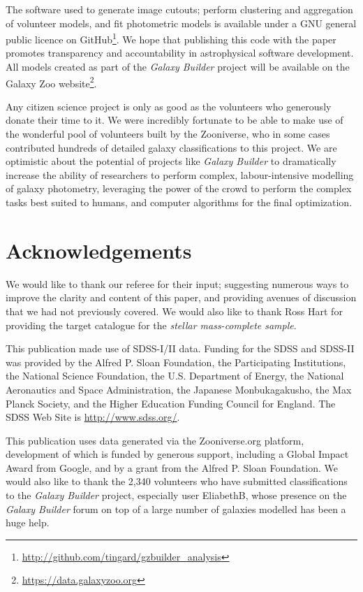 \documentclass[trackchanges]{aastex63}
\begin{document}
The software used to generate image cutouts; perform clustering and aggregation of volunteer models, and fit photometric models is available under a GNU general public licence on GitHub\footnote{\url{http://github.com/tingard/gzbuilder_analysis}}. We hope that publishing this code with the paper promotes transparency and accountability in astrophysical software development. All models created as part of the \textit{Galaxy Builder} project will be available on the Galaxy Zoo website\footnote{\url{https://data.galaxyzoo.org}}.

Any citizen science project is only as good as the volunteers who generously donate their time to it. We were incredibly fortunate to be able to make use of the wonderful pool of volunteers built by the Zooniverse, who in some cases contributed hundreds of detailed galaxy classifications to this project. We are optimistic about the potential of projects like \textit{Galaxy Builder} to dramatically increase the ability of researchers to perform complex, labour-intensive modelling of galaxy photometry, leveraging the power of the crowd to perform the complex tasks best suited to humans, and computer algorithms for the final optimization.

\section{Acknowledgements}
\label{sec:acknowledgements}
We would like to thank our referee for their input; suggesting numerous ways to improve the clarity and content of this paper, and providing avenues of discussion that we had not previously covered. We would also like to thank Ross Hart for providing the target catalogue for the \textit{stellar mass-complete sample}.

This publication made use of SDSS-I/II data. Funding for the SDSS and SDSS-II was provided by the Alfred P. Sloan Foundation, the Participating Institutions, the National Science Foundation, the U.S. Department of Energy, the National Aeronautics and Space Administration, the Japanese Monbukagakusho, the Max Planck Society, and the Higher Education Funding Council for England. The SDSS Web Site is \url{http://www.sdss.org/}.

This publication uses data generated via the Zooniverse.org platform, development of which is funded by generous support, including a Global Impact Award from Google, and by a grant from the Alfred P. Sloan Foundation. We would also like to thank the 2,340 volunteers who have submitted classifications to the \textit{Galaxy Builder} project, especially user EliabethB, whose presence on the \textit{Galaxy Builder} forum on top of a large number of galaxies modelled has been a huge help.
\end{document}
